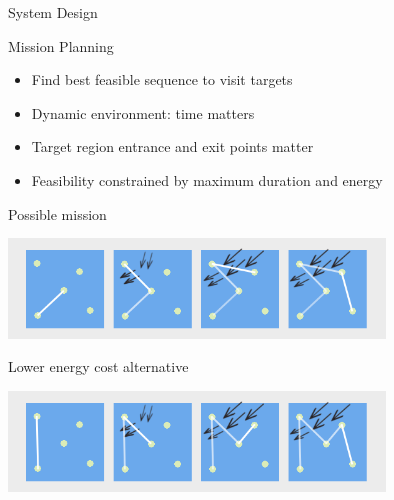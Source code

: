 \documentclass[9pt]{beamer}
\begin{document}
\begin{frame}{System Design}
    \begin{block}{Mission Planning}
	    \begin{itemize}
	        \item Find best feasible sequence to visit targets
	        \item Dynamic environment: time matters 
	        \item Target region entrance and exit points matter
	        \item Feasibility constrained by maximum duration and energy
        \end{itemize}
    \end{block}
    \begin{block}{Possible mission}
        \begin{center}
            \includegraphics[width=0.75\textwidth,trim={1cm 1cm 1cm 1cm},clip]{img/mission_planning_planA.png}
        \end{center}
    \end{block}
    \begin{block}{Lower energy cost alternative}
        \begin{center}
            \includegraphics[width=0.75\textwidth,trim={1cm 1cm 1cm 1cm},clip]{img/mission_planning_planB.png}
        \end{center}
    \end{block}
\end{frame}
\end{document}
